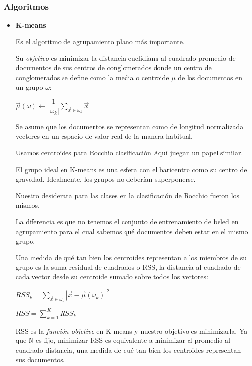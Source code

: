 \documentclass{llncs}
\begin{document}
\subsubsection{Algoritmos}
\begin{itemize}
	\item \textbf{K-means}
	
	Es el algoritmo de agrupamiento plano más importante. 
	
	Su \textit{objetivo} es minimizar la distancia euclidiana al cuadrado promedio de documentos de sus centros de conglomerados donde un centro de conglomerados se define como la media o centroide $\mu$ de los documentos en un grupo $\omega$:
	
	\begin{center}
		$ \overrightarrow{\mu}(\omega) \leftarrow \dfrac{1}{|\omega_{k}|} \sum_{\overrightarrow{x} \in \omega_{k}} \overrightarrow{x} $
	\end{center}
	
	Se asume que los documentos se representan como de longitud normalizada vectores en un espacio de valor real de la manera habitual. 
	
	Usamos centroides para Rocchio clasificación Aquí juegan un papel similar.

	El grupo ideal en K-means es una esfera con el baricentro como su centro de gravedad. Idealmente, los grupos no deberían superponerse. 
	
	Nuestro desiderata para las clases en la clasificación de Rocchio fueron los mismos. 
	
	La diferencia es que no tenemos el conjunto de entrenamiento de beled en agrupamiento para el cual sabemos qué documentos deben
	estar en el mismo grupo.
	
	Una medida de qué tan bien los centroides representan a los miembros de su grupo es la suma residual de cuadrados o RSS, la distancia al cuadrado de cada vector desde su centroide sumado sobre todos los vectores:
	
	\begin{center}
		$ RSS_{k} = \sum_{\overrightarrow{x} \in \omega_{k}}|\overrightarrow{x} - \overrightarrow{\mu}(\omega_{k})|^2$
	
	\vspace{1em}
	$ RSS = \sum_{k=1}^{K} RSS_{k} $
	\end{center}

	RSS es la \textit{función objetivo} en K-means y nuestro objetivo es minimizarla. Ya que N es fijo, minimizar RSS es equivalente a minimizar el promedio al cuadrado distancia, una medida de qué tan bien los centroides representan sus documentos.
	

\end{itemize}
\end{document}
